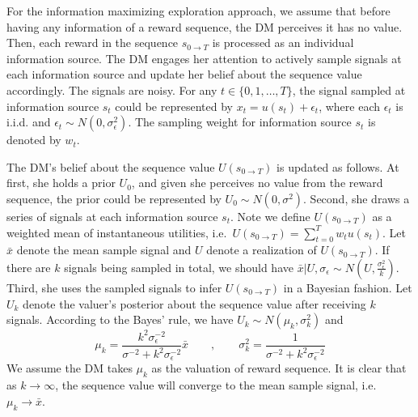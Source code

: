 \documentclass[
  12pt,
]{article}
\begin{document}
For the information maximizing exploration approach, we assume that
before having any information of a reward sequence, the DM perceives it
has no value. Then, each reward in the sequence \(s_{0\rightarrow T}\)
is processed as an individual information source. The DM engages her
attention to actively sample signals at each information source and
update her belief about the sequence value accordingly. The signals are
noisy. For any \(t\in\{0,1,…,T\}\), the signal sampled at information
source \(s_t\) could be represented by \(x_t =u(s_t)+\epsilon_t\), where
each \(\epsilon_t\) is i.i.d. and
\(\epsilon_t \sim N(0,\sigma_\epsilon^2)\). The sampling weight for
information source \(s_t\) is denoted by \(w_t\).

The DM's belief about the sequence value \(U(s_{0\rightarrow T})\) is
updated as follows. At first, she holds a prior \(U_0\), and given she
perceives no value from the reward sequence, the prior could be
represented by \(U_0 \sim N(0, \sigma^2)\). Second, she draws a series
of signals at each information source \(s_t\). Note we define
\(U(s_{0\rightarrow T})\) as a weighted mean of instantaneous utilities,
i.e.~\(U(s_{0\rightarrow T})=\sum_{t=0}^Tw_tu(s_t)\). Let \(\bar{x}\)
denote the mean sample signal and \(U\) denote a realization of
\(U(s_{0\rightarrow T})\). If there are \(k\) signals being sampled in
total, we should have
\(\bar{x} | U, \sigma_\epsilon\sim N(U,\frac{\sigma_{\epsilon}^2}{k})\).
Third, she uses the sampled signals to infer \(U(s_{0\rightarrow T})\)
in a Bayesian fashion. Let \(U_k\) denote the valuer's posterior about
the sequence value after receiving \(k\) signals. According to the
Bayes' rule, we have \(U_k\sim N(\mu_k,\sigma_k^2)\) and\[
\mu_k = \frac{k^2\sigma_\epsilon^{-2}}{\sigma^{-2}+k^2\sigma_\epsilon^{-2}}\bar{x}\qquad,\qquad 
\sigma_k^2 =  \frac{1}{\sigma^{-2}+k^2\sigma_\epsilon^{-2}}
\]We assume the DM takes \(\mu_k\) as the valuation of reward sequence.
It is clear that as \(k\rightarrow \infty\), the sequence value will
converge to the mean sample signal, i.e.~\(\mu_k \rightarrow \bar{x}\).
\end{document}
